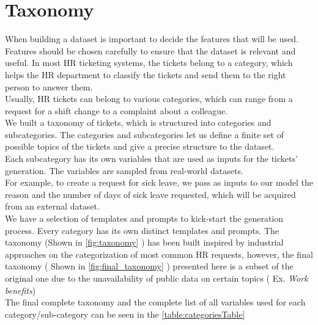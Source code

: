 \section{Taxonomy}

When building a dataset is important to decide the features that will be used. Features should be chosen carefully to ensure that the dataset is relevant and useful. In most HR ticketing systems, the tickets belong to a category, which helps the HR department to classify the tickets and send them to the right person to answer them. \\
Usually, HR tickets can belong to various categories, which can range from a request for a shift change to a complaint about a colleague. \\
We built a taxonomy of tickets, which is structured into categories and subcategories. The categories and subcategories let us define a finite set of possible topics of the tickets and give a precise structure to the dataset. \\
Each subcategory has its own variables that are used as inputs for the tickets' generation. The variables are sampled from real-world datasets. \\
For example, to create a request for sick leave, we pass as inputs to our model the reason and the number of days of sick leave requested, which will be acquired from an external dataset. \\
We have a selection of templates and prompts to kick-start the generation process. Every category has its own distinct templates and prompts. The taxonomy (Shown in \autoref{fig:taxonomy} ) has been built inspired by industrial approaches on the categorization of most common HR requests, however, the final taxonomy ( Shown in \autoref{fig:final_taxonomy} ) presented here is a subset of the original one due to the unavailability of public data on certain topics ( Ex. \textit{Work benefits}) \\ The final complete taxonomy and the complete list of all variables used for each category/sub-category can be seen in the \autoref{table:categoriesTable}

